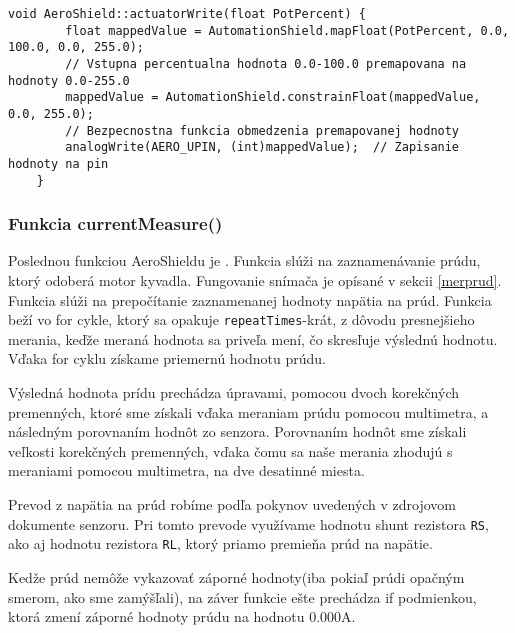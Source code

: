 	
\begin{lstlisting}[caption={Zdrojový kód funkcie actuatorWrite.},captionpos=b]
	void AeroShield::actuatorWrite(float PotPercent) {   
		float mappedValue = AutomationShield.mapFloat(PotPercent, 0.0, 100.0, 0.0, 255.0);       
		// Vstupna percentualna hodnota 0.0-100.0 premapovana na hodnoty 0.0-255.0
		mappedValue = AutomationShield.constrainFloat(mappedValue, 0.0, 255.0);  
		// Bezpecnostna funkcia obmedzenia premapovanej hodnoty
		analogWrite(AERO_UPIN, (int)mappedValue);  // Zapisanie hodnoty na pin
	}
\end{lstlisting}
	
	
\subsubsection{Funkcia currentMeasure()}	
	
Poslednou funkciou AeroShieldu je . Funkcia slúži na zaznamenávanie prúdu, ktorý odoberá motor kyvadla. Fungovanie snímača je opísané v sekcii \ref{merprud}. Funkcia slúži na prepočítanie zaznamenanej hodnoty napätia na prúd. Funkcia beží vo for cykle, ktorý sa opakuje \verb|repeatTimes|-krát, z dôvodu presnejšieho merania, keďže meraná hodnota sa priveľa mení, čo skresľuje výslednú hodnotu. Vďaka for cyklu získame priemernú hodnotu prúdu. 

Výsledná hodnota prídu prechádza úpravami, pomocou dvoch korekčných premenných, ktoré sme získali vďaka meraniam prúdu pomocou multimetra, a následným porovnaním hodnôt zo senzora. Porovnaním hodnôt sme získali veľkosti korekčných premenných, vďaka čomu sa naše merania zhodujú s meraniami pomocou multimetra, na dve desatinné miesta. 

Prevod z napätia na prúd robíme podľa pokynov uvedených v zdrojovom dokumente senzoru. Pri tomto prevode využívame hodnotu shunt rezistora \verb|RS|, ako aj hodnotu rezistora \verb|RL|, ktorý priamo premieňa prúd na napätie. 

Kedže prúd nemôže vykazovať záporné hodnoty(iba pokiaľ prúdi opačným smerom, ako sme zamýšľali), na záver funkcie ešte prechádza if podmienkou, ktorá zmení záporné hodnoty prúdu na hodnotu 0.000A.  
	

